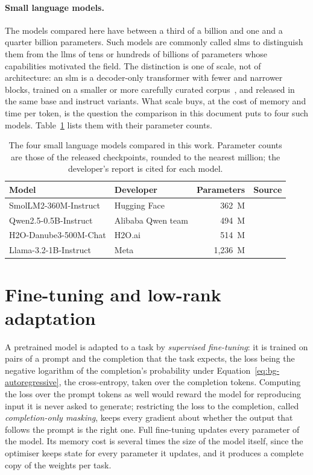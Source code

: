 \paragraph{Small language models.} The models compared here have between a third of a billion and
one and a quarter billion parameters. Such models are commonly called \glspl{slm} to distinguish
them from the \glspl{llm} of tens or hundreds of billions of parameters whose capabilities
motivated the field. The distinction is one of scale, not of architecture: an \gls{slm} is a
decoder-only transformer with fewer and narrower blocks, trained on a smaller or more carefully
curated corpus~\cite{smollm2}, and released in the same base and instruct variants. What scale
buys, at the cost of memory and time per token, is the question the comparison in this document
puts to four such models. Table~\ref{tab:bg-models} lists them with their parameter counts.

\begin{table}[htbp]
\centering
\caption[Small language models compared in this work]{The four small language models compared in
this work. Parameter counts are those of the released checkpoints, rounded to the nearest million;
the developer's report is cited for each model.}
\label{tab:bg-models}
\begin{tabular}{@{}llrl@{}}
\toprule
Model & Developer & Parameters & Source \\
\midrule
SmolLM2-360M-Instruct & Hugging Face & 362~M & \cite{smollm2} \\
Qwen2.5-0.5B-Instruct & Alibaba Qwen team & 494~M & \cite{qwen25} \\
H2O-Danube3-500M-Chat & H2O.ai & 514~M & \cite{danube3} \\
Llama-3.2-1B-Instruct & Meta & 1{,}236~M & \cite{llama32} \\
\bottomrule
\end{tabular}
\end{table}

\noautobreak
\section{Fine-tuning and low-rank adaptation}
\label{sec:bg-lora}

A pretrained model is adapted to a task by \emph{supervised fine-tuning}: it is trained on pairs
of a prompt and the completion that the task expects, the loss being the negative logarithm of
the completion's probability under Equation~\ref{eq:bg-autoregressive}, the cross-entropy, taken
over the completion tokens. Computing the loss over
the prompt tokens as well would reward the model for reproducing input it is never asked to
generate; restricting the loss to the completion, called \emph{completion-only masking}, keeps
every gradient about whether the output that follows the prompt is the right one. Full
fine-tuning updates every parameter of the model. Its memory cost is several times the size of
the model itself, since the optimiser keeps state for every parameter it updates, and it produces
a complete copy of the weights per task.

